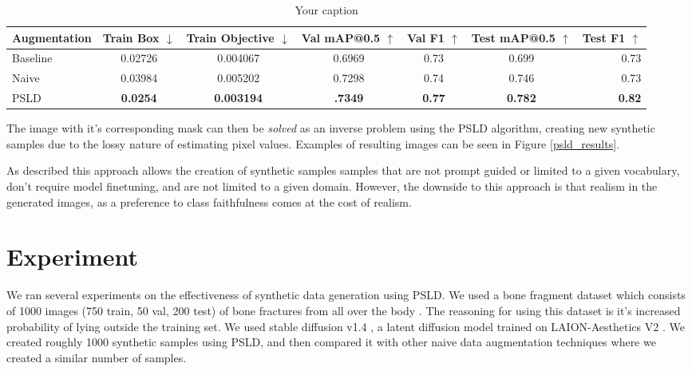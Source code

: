 \documentclass{article}
\begin{document}
\begin{table}[ht!]
\centering
\caption{Your caption}
\label{results}
\begin{tabular}{lcccccr}
\toprule
Augmentation & Train Box $\downarrow$ & Train Objective $\downarrow$ & Val mAP@0.5 $\uparrow$ & Val F1  $\uparrow$ & Test mAP@0.5 $\uparrow$ & Test F1 $\uparrow$\\
\midrule
Baseline & 0.02726 & 0.004067 & 0.6969 & 0.73 & 0.699 & 0.73\\
Naive &  0.03984 & 0.005202 & 0.7298 & 0.74 & 0.746 & 0.73\\
PSLD & \textbf{0.0254} & \textbf{0.003194} & \textbf{.7349} &  \textbf{0.77} & \textbf{0.782} & \textbf{0.82} \\
\bottomrule
\end{tabular}
\end{table}

The image with it's corresponding mask can then be \textit{solved} as an inverse problem using the PSLD algorithm, creating new synthetic samples due to the lossy nature
of estimating pixel values. Examples of resulting images can be seen in Figure \ref{psld_results}.

As described this approach allows the creation of synthetic samples samples that are not prompt guided or limited to a given vocabulary, don't require model
finetuning, and are not limited to a given domain. However, the downside to this approach is that realism in the generated images, as a preference to class faithfulness
comes at the cost of realism.



\section{Experiment}

We ran several experiments on the effectiveness of synthetic data generation using PSLD. We used a bone fragment dataset which consists of 1000 images 
(750 train, 50 val, 200 test) of bone fractures from all over the body \cite{bone-fracture-detection-ivsy6_dataset}. The reasoning for using this dataset is 
it's increased probability of lying outside the training set. We used stable diffusion v1.4 \cite{Rombach_2022_CVPR}, a latent diffusion model trained on 
LAION-Aesthetics V2 \cite{2210.08402}. We created roughly 1000 synthetic samples using PSLD, and then compared it with other naive data augmentation techniques 
where we created a similar number of samples.
\end{document}
